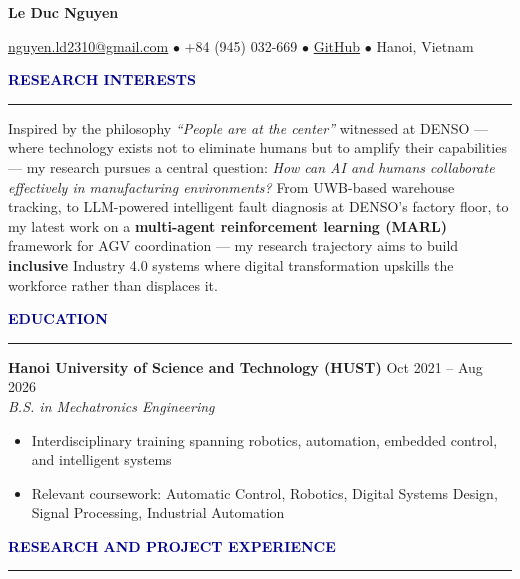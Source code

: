 \documentclass[11pt,letterpaper]{article}
\newcommand{\name}[1]{
  \centerline{\Large\textbf{#1}}
  \vspace{0.5em}
}
\newcommand{\contact}[4]{
  \centerline{\small #1 \quad $\bullet$ \quad #2 \quad $\bullet$ \quad #3 \quad $\bullet$ \quad #4}
  \vspace{1em}
}
\newcommand{\sectiontitle}[1]{
  \vspace{0.3em}
  {\large\textbf{\textcolor{darkblue}{#1}}}
  \vspace{0.2em}
  \hrule
  \vspace{0.3em}
}
\newcommand{\entry}[4]{
  \textbf{#1} \hfill #2 \\
  \textit{#3} \\
  #4
  \vspace{0.3em}
}
\begin{document}
\name{Le Duc Nguyen}

\contact
  {\href{mailto:nguyen.ld2310@gmail.com}{nguyen.ld2310@gmail.com}}
  {+84 (945) 032-669}
  {\href{https://github.com/AndrewHaward2310}{GitHub}}
  {Hanoi, Vietnam}

\sectiontitle{RESEARCH INTERESTS}

Inspired by the philosophy \textit{``People are at the center''} witnessed at DENSO --- where technology exists not to eliminate humans but to amplify their capabilities --- my research pursues a central question: \textit{How can AI and humans collaborate effectively in manufacturing environments?} From UWB-based warehouse tracking, to LLM-powered intelligent fault diagnosis at DENSO's factory floor, to my latest work on a \textbf{multi-agent reinforcement learning (MARL)} framework for AGV coordination --- my research trajectory aims to build \textbf{inclusive} Industry 4.0 systems where digital transformation upskills the workforce rather than displaces it.

\sectiontitle{EDUCATION}

\entry
  {Hanoi University of Science and Technology (HUST)}
  {Oct 2021 -- Aug 2026}
  {B.S. in Mechatronics Engineering}
  {
    \begin{itemize}[leftmargin=1.5em, topsep=0pt, itemsep=0.2em]
      \item Interdisciplinary training spanning robotics, automation, embedded control, and intelligent systems
      \item Relevant coursework: Automatic Control, Robotics, Digital Systems Design, Signal Processing, Industrial Automation
    \end{itemize}
  }

\sectiontitle{RESEARCH AND PROJECT EXPERIENCE}
\end{document}
